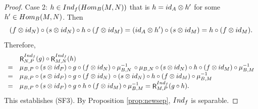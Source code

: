 \documentclass[10pt,a4paper]{amsart}
\newcommand{\Hom}{{\rm Hom}}
\newcommand{\Ind}{{\rm Ind}}
\DeclareMathOperator{\R}{\mathsf R}
\newcommand{\id}{{\rm id}}
\begin{document}
\begin{proof}
Case 2: $h \in \Ind_f(\Hom_B(M,N))$
that is $h = \id_A \otimes h'$ for 
some $h' \in \Hom_B(M,N)$. Then
\[
(f \otimes \id_N) \circ
(s \otimes \id_N) \circ h \circ 
(f \otimes \id_M)  = 
(\id_A \otimes h') \circ 
(s \otimes \id_M) = 
h \circ (f \otimes \id_M).
\]
Therefore,
{\small \[
\begin{array}{cl}
 & \R_{N,P}^{\Ind_f}(g) \circ
\R_{M,N}^{\Ind_f}(h) \\
=& \mu_{B,P} \circ (s \otimes \id_P)
\circ g \circ (f \otimes \id_N)
\circ \mu_{B,N}^{-1} \, \circ 
\mu_{B,N} \circ (s \otimes \id_N)
\circ h \circ (f \otimes \id_M) 
\circ \mu_{B,M}^{-1} \\
=& \mu_{B,P}  \circ  (s \otimes \id_P)
\circ g \circ 
(f \otimes \id_N) \, \circ 
(s \otimes \id_N)  \circ h \circ
(f \otimes \id_M)  \circ \mu_{B,M}^{-1} \\
=& \mu_{B,P} \circ (s \otimes \id_P) 
\circ g \circ h \circ 
(f \otimes \id_M) \circ \mu_{B,M}^{-1} 
= \R_{M,P}^{\Ind_f}(g \circ h).
\end{array}
\]}
This establishes (SF3).
By Proposition \ref{prop:newsep},
$\Ind_f$ is separable.
\end{proof}
\end{document}
